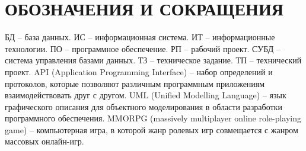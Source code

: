 \section*{ОБОЗНАЧЕНИЯ И СОКРАЩЕНИЯ}

БД -- база данных.
ИС -- информационная система.
ИТ -- информационные технологии. 
ПО -- программное обеспечение.
РП -- рабочий проект.
СУБД -- система управления базами данных.
ТЗ -- техническое задание.
ТП -- технический проект.
API (Application Programming Interface) -- набор определений и протоколов, которые позволяют различным программным приложениям взаимодействовать друг с другом.
UML (Unified Modelling Language) -- язык графического описания для объектного моделирования в области разработки программного обеспечения.
MMORPG (massively multiplayer online role-playing game) -- компьютерная игра, в которой жанр ролевых игр совмещается с жанром массовых онлайн-игр.
